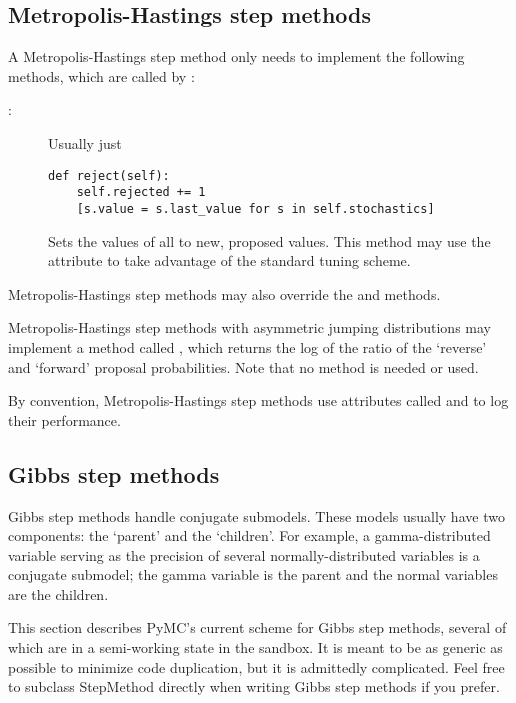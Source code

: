 \subsection{Metropolis-Hastings step methods} \label{user-metro}
A Metropolis-Hastings step method only needs to implement the following methods, which are called by :
\begin{description}
   \item[:] Usually just
   \begin{verbatim}
def reject(self):
    self.rejected += 1
    [s.value = s.last_value for s in self.stochastics]
   \end{verbatim}
   \item[] Sets the values of all  to new, proposed values. This method may use the  attribute to take advantage of the standard tuning scheme.
\end{description}
Metropolis-Hastings step methods may also override the  and  methods.

Metropolis-Hastings step methods with asymmetric jumping distributions may implement a method called , which returns the log of the ratio of the `reverse' and `forward' proposal probabilities. Note that no  method is needed or used.

By convention, Metropolis-Hastings step methods use attributes called  and  to log their performance.

\hypertarget{user-gibbs}{}
\subsection{Gibbs step methods} \label{user-gibbs}

Gibbs step methods handle conjugate submodels. These models usually have two components: the `parent' and the `children'. For example, a gamma-distributed variable serving as the precision of several normally-distributed variables is a conjugate submodel; the gamma variable is the parent and the normal variables are the children.

This section describes PyMC's current scheme for Gibbs step methods, several of which are in a semi-working state in the sandbox. It is meant to be as generic as possible to minimize code duplication, but it is admittedly complicated. Feel free to subclass StepMethod directly when writing Gibbs step methods if you prefer.

